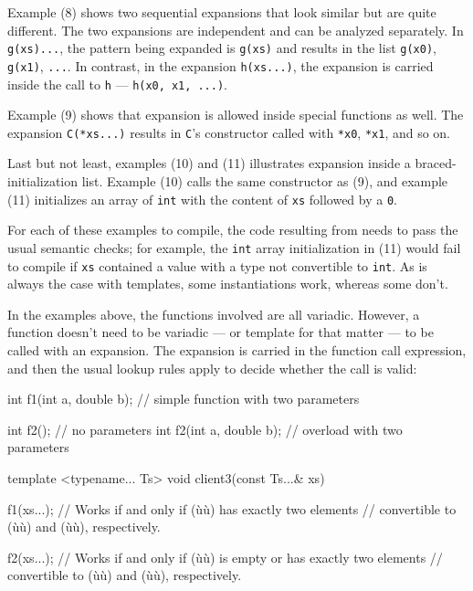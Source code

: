 Example (8) shows two sequential expansions that look similar but are
quite different. The two expansions are independent and can be analyzed
separately. In \lstinline!g(xs)...!, the pattern being expanded is
\lstinline!g(xs)! and results in the list \lstinline!g(x0)!, \lstinline!g(x1)!,
\lstinline!...!. In contrast, in the expansion \lstinline!h(xs...)!, the
expansion is carried inside the call to \lstinline!h! ---
\lstinline!h(x0,!~\lstinline!x1,!~\lstinline!...)!.

Example (9) shows that expansion is allowed inside special functions as
well. The expansion \lstinline!C(*xs...)! results in \lstinline!C!'s
constructor called with \lstinline!*x0!, \lstinline!*x1!, and so on.

Last but not least, examples (10) and (11) illustrates expansion inside
a braced-initialization list. Example (10) calls the same constructor as
(9), and example (11) initializes an array of \lstinline!int! with the
content of \lstinline!xs! followed by a \lstinline!0!.

For each of these examples to compile, the code resulting from
 needs to pass the usual semantic checks; for
example, the \lstinline!int! array initialization in (11) would fail to
compile if \lstinline!xs! contained a value with a type not convertible to
\lstinline!int!. As is always the case with templates, some instantiations
work, whereas some don't.

In the examples above, the functions involved are all variadic. However,
a function doesn't need to be variadic --- or template for that matter
--- to be called with an expansion. The expansion is carried in the
function call expression, and then the usual lookup rules apply to
decide whether the call is valid:

\begin{emcppslisting}
int f1(int a, double b);  // simple function with two parameters

int f2();                 // no parameters
int f2(int a, double b);  // overload with two parameters

template <typename... Ts>
void client3(const Ts...& xs)
{
    f1(xs...);  // Works if and only if (ù{}ù) has exactly two elements
                // convertible to (ù{}ù) and (ù{}ù), respectively.

    f2(xs...);  // Works if and only if (ù{}ù) is empty or has exactly two elements
                // convertible to (ù{}ù) and (ù{}ù), respectively.
}
\end{emcppslisting}
    

